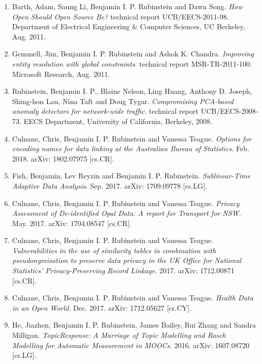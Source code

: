 \documentclass[a4paper,12pt]{article}
\begin{document}
\begin{enumerate}
\setcounter{enumi}{\value{list}}

\item Barth, Adam, Saung Li, Benjamin I. P. Rubinstein and Dawn Song.
\emph{How Open Should Open Source Be?}
technical report UCB/EECS-2011-98.
Department of Electrical Engineering \& Computer Sciences, UC Berkeley, Aug. 2011.

\item Gemmell, Jim, Benjamin I. P. Rubinstein and Ashok K. Chandra.
\emph{Improving entity resolution with global constraints}.
technical report MSR-TR-2011-100.
Microsoft Research, Aug. 2011.

\item Rubinstein, Benjamin I. P., Blaine Nelson, Ling Huang, Anthony D. Joseph, Shing-hon Lau, Nina Taft and Doug Tygar.
\emph{Compromising PCA-based anomaly detectors for network-wide traffic}.
technical report UCB/EECS-2008-73.
EECS Department, University of California, Berkeley, 2008.

\item Culnane, Chris, Benjamin I. P. Rubinstein and Vanessa Teague.
\emph{Options for encoding names for data linking at the Australian Bureau of Statistics}.
Feb. 2018.
arXiv: 1802.07975 [cs.CR].

\item Fish, Benjamin, Lev Reyzin and Benjamin I. P. Rubinstein.
\emph{Sublinear-Time Adaptive Data Analysis}.
Sep. 2017.
arXiv: 1709.09778 [cs.LG].

\item Culnane, Chris, Benjamin I. P. Rubinstein and Vanessa Teague.
\emph{Privacy Assessment of De-identified Opal Data: A report for Transport for NSW}.
May. 2017.
arXiv: 1704.08547 [cs.CR].

\item Culnane, Chris, Benjamin I. P. Rubinstein and Vanessa Teague.
\emph{Vulnerabilities in the use of similarity tables in combination with pseudonymisation to preserve data privacy in the UK Office for National Statistics' Privacy-Preserving Record Linkage}.
2017.
arXiv: 1712.00871 [cs.CR].

\item Culnane, Chris, Benjamin I. P. Rubinstein and Vanessa Teague.
\emph{Health Data in an Open World}.
Dec. 2017.
arXiv: 1712.05627 [cs.CY].

\item He, Jiazhen, Benjamin I. P. Rubinstein, James Bailey, Rui Zhang and Sandra Milligan.
\emph{TopicResponse: A Marriage of Topic Modelling and Rasch Modelling for Automatic Measurement in MOOCs}.
2016.
arXiv: 1607.08720 [cs.LG].


\setcounter{list}{\value{enumi}}
\end{enumerate}
\end{document}
